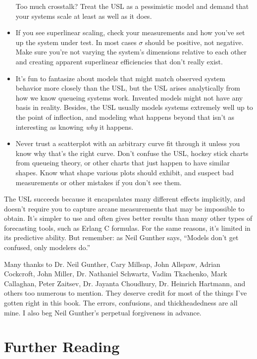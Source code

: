 \documentclass{vivid_layout}
\begin{document}
\begin{itemize}
Too much crosstalk? Treat the USL as a pessimistic model and demand that your
systems scale at least as well as it does.
\item If you see superlinear scaling, check your measurements and how you've set
up the system under test. In most cases $\sigma$ should be positive, not
negative. Make sure you're not varying the system's dimensions relative to each
other and creating apparent superlinear efficiencies that don't really exist.
\item It's fun to fantasize about models that might match observed system
behavior more closely than the USL, but the USL arises analytically from how we
know queueing systems work. Invented models might not have any basis in reality.
Besides, the USL usually models systems extremely well up to the point of
inflection, and modeling what happens beyond that isn't as interesting as
knowing {\itshape why} it happens.
\item Never trust a scatterplot with an arbitrary curve fit through it unless
you know why that's the right curve. Don't confuse the USL, hockey stick charts
from queueing theory, or other charts that just happen to have similar shapes.
Know what shape various plots should exhibit, and suspect bad measurements or
other mistakes if you don't see them.
\end{itemize}

The USL succeeds because it encapsulates many different effects implicitly, and
doesn't require you to capture arcane measurements that may be impossible to
obtain. It's simpler to use and often gives better results than many other types of
forecasting tools, such as Erlang C formulas. For the same reasons, it's limited
in its predictive ability. But remember: as Neil Gunther says, ``Models don't
get confused, only modelers do.''

Many thanks to Dr. Neil Gunther, Cary Millsap, John Allspaw, Adrian Cockcroft,
John Miller, Dr.  Nathaniel Schwartz, Vadim Tkachenko, Mark Callaghan, Peter
Zaitsev, Dr. Jayanta Choudhury, Dr. Heinrich Hartmann, and others too numerous
to mention. They deserve credit for most of the things I've gotten right in this
book. The errors, confusions, and thickheadedness are all mine. I also beg Neil
Gunther's perpetual forgiveness in advance.

\section{Further Reading}
\end{document}
